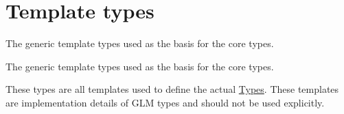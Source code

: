 \hypertarget{group__core__template}{}\section{Template types}
\label{group__core__template}


The generic template types used as the basis for the core types.  


The generic template types used as the basis for the core types. 

These types are all templates used to define the actual \mbox{\hyperlink{group__core__types}{Types}}. These templates are implementation details of G\+LM types and should not be used explicitly. 